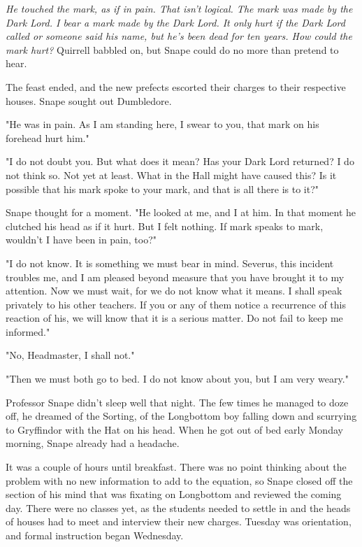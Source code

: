 \documentclass[a4paper,11pt]{article}
\begin{document}
\emph{He touched the mark, as if in pain. That isn't logical. The mark was made by the Dark Lord. I bear a mark made by the Dark Lord. It only hurt if the Dark Lord called or someone said his name, but he's been dead for ten years. How could the mark hurt?} Quirrell babbled on, but Snape could do no more than pretend to hear.

The feast ended, and the new prefects escorted their charges to their respective houses. Snape sought out Dumbledore.

"He was in pain. As I am standing here, I swear to you, that mark on his forehead hurt him."

"I do not doubt you. But what does it mean? Has your Dark Lord returned? I do not think so. Not yet at least. What in the Hall might have caused this? Is it possible that his mark spoke to your mark, and that is all there is to it?"

Snape thought for a moment. "He looked at me, and I at him. In that moment he clutched his head as if it hurt. But I felt nothing. If mark speaks to mark, wouldn't I have been in pain, too?"

"I do not know. It is something we must bear in mind. Severus, this incident troubles me, and I am pleased beyond measure that you have brought it to my attention. Now we must wait, for we do not know what it means. I shall speak privately to his other teachers. If you or any of them notice a recurrence of this reaction of his, we will know that it is a serious matter. Do not fail to keep me informed."

"No, Headmaster, I shall not."

"Then we must both go to bed. I do not know about you, but I am very weary."

Professor Snape didn't sleep well that night. The few times he managed to doze off, he dreamed of the Sorting, of the Longbottom boy falling down and scurrying to Gryffindor with the Hat on his head. When he got out of bed early Monday morning, Snape already had a headache.

It was a couple of hours until breakfast. There was no point thinking about the problem with no new information to add to the equation, so Snape closed off the section of his mind that was fixating on Longbottom and reviewed the coming day. There were no classes yet, as the students needed to settle in and the heads of houses had to meet and interview their new charges. Tuesday was orientation, and formal instruction began Wednesday.
\end{document}
